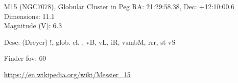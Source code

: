 \begin{block}{M15 (NGC7078), Globular Cluster in Peg}
    RA: 21:29:58.38, Dec: +12:10:00.6 \\ 
    Dimensions: 11.1 \\ 
    Magnitude (V): 6.3


    Desc: (Dreyer) !, glob. cl. , vB, vL, iR, vsmbM, rrr, st vS 

    Finder fov: 60 

    \url{https://en.wikipedia.org/wiki/Messier_15} 
\end{block}